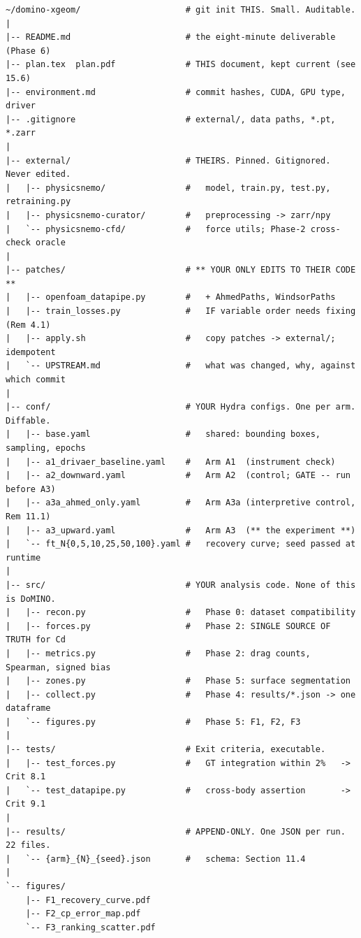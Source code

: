 \documentclass[10pt,a4paper]{article}
\theoremstyle{definition}
\begin{document}
\begin{lstlisting}[style=sh]
~/domino-xgeom/                     # git init THIS. Small. Auditable.
|
|-- README.md                       # the eight-minute deliverable (Phase 6)
|-- plan.tex  plan.pdf              # THIS document, kept current (see 15.6)
|-- environment.md                  # commit hashes, CUDA, GPU type, driver
|-- .gitignore                      # external/, data paths, *.pt, *.zarr
|
|-- external/                       # THEIRS. Pinned. Gitignored. Never edited.
|   |-- physicsnemo/                #   model, train.py, test.py, retraining.py
|   |-- physicsnemo-curator/        #   preprocessing -> zarr/npy
|   `-- physicsnemo-cfd/            #   force utils; Phase-2 cross-check oracle
|
|-- patches/                        # ** YOUR ONLY EDITS TO THEIR CODE **
|   |-- openfoam_datapipe.py        #   + AhmedPaths, WindsorPaths
|   |-- train_losses.py             #   IF variable order needs fixing (Rem 4.1)
|   |-- apply.sh                    #   copy patches -> external/; idempotent
|   `-- UPSTREAM.md                 #   what was changed, why, against which commit
|
|-- conf/                           # YOUR Hydra configs. One per arm. Diffable.
|   |-- base.yaml                   #   shared: bounding boxes, sampling, epochs
|   |-- a1_drivaer_baseline.yaml    #   Arm A1  (instrument check)
|   |-- a2_downward.yaml            #   Arm A2  (control; GATE -- run before A3)
|   |-- a3a_ahmed_only.yaml         #   Arm A3a (interpretive control, Rem 11.1)
|   |-- a3_upward.yaml              #   Arm A3  (** the experiment **)
|   `-- ft_N{0,5,10,25,50,100}.yaml #   recovery curve; seed passed at runtime
|
|-- src/                            # YOUR analysis code. None of this is DoMINO.
|   |-- recon.py                    #   Phase 0: dataset compatibility
|   |-- forces.py                   #   Phase 2: SINGLE SOURCE OF TRUTH for Cd
|   |-- metrics.py                  #   Phase 2: drag counts, Spearman, signed bias
|   |-- zones.py                    #   Phase 5: surface segmentation
|   |-- collect.py                  #   Phase 4: results/*.json -> one dataframe
|   `-- figures.py                  #   Phase 5: F1, F2, F3
|
|-- tests/                          # Exit criteria, executable.
|   |-- test_forces.py              #   GT integration within 2%   -> Crit 8.1
|   `-- test_datapipe.py            #   cross-body assertion       -> Crit 9.1
|
|-- results/                        # APPEND-ONLY. One JSON per run. 22 files.
|   `-- {arm}_{N}_{seed}.json       #   schema: Section 11.4
|
`-- figures/
    |-- F1_recovery_curve.pdf
    |-- F2_cp_error_map.pdf
    `-- F3_ranking_scatter.pdf
\end{lstlisting}
\end{document}
